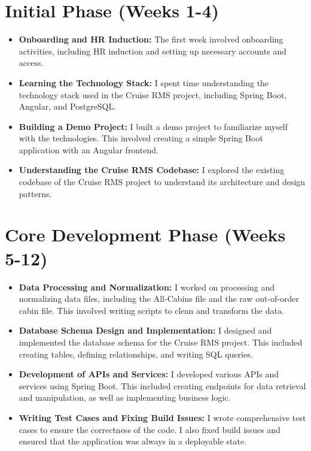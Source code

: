 \documentclass[openany, 11pt]{report} %
\begin{document}
\section{Initial Phase (Weeks 1-4)}
\begin{itemize}
    \item \textbf{Onboarding and HR Induction:} The first week involved onboarding activities, including HR induction and setting up necessary accounts and access.
    \item \textbf{Learning the Technology Stack:} I spent time understanding the technology stack used in the Cruise RMS project, including Spring Boot, Angular, and PostgreSQL.
    \item \textbf{Building a Demo Project:} I built a demo project to familiarize myself with the technologies. This involved creating a simple Spring Boot application with an Angular frontend.
    \item \textbf{Understanding the Cruise RMS Codebase:} I explored the existing codebase of the Cruise RMS project to understand its architecture and design patterns.
\end{itemize}

\section{Core Development Phase (Weeks 5-12)}
\begin{itemize}
    \item \textbf{Data Processing and Normalization:} I worked on processing and normalizing data files, including the All-Cabins file and the raw out-of-order cabin file. This involved writing scripts to clean and transform the data.
    \item \textbf{Database Schema Design and Implementation:} I designed and implemented the database schema for the Cruise RMS project. This included creating tables, defining relationships, and writing SQL queries.
    \item \textbf{Development of APIs and Services:} I developed various APIs and services using Spring Boot. This included creating endpoints for data retrieval and manipulation, as well as implementing business logic.
    \item \textbf{Writing Test Cases and Fixing Build Issues:} I wrote comprehensive test cases to ensure the correctness of the code. I also fixed build issues and ensured that the application was always in a deployable state.
\end{itemize}
\end{document}
